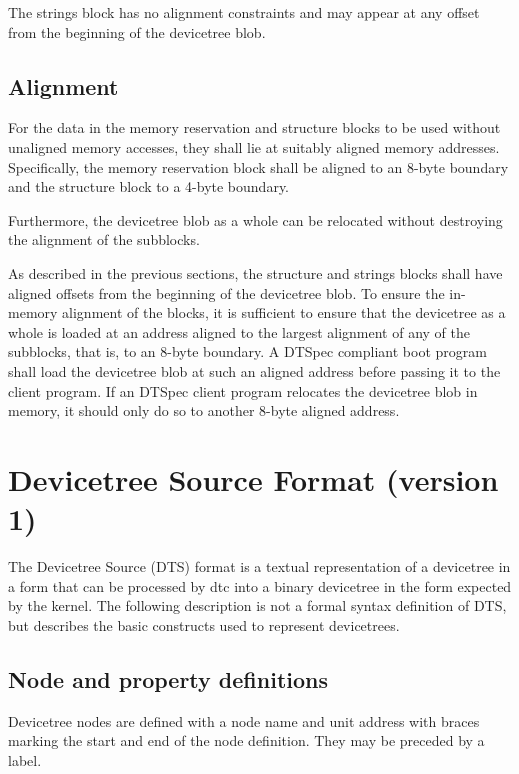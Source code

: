 \documentclass[a4paper,10pt,oneside]{sphinxmanual}
\begin{document}
The strings block has no alignment constraints and may appear at any
offset from the beginning of the devicetree blob.


\section{Alignment}
\label{flattened-format:alignment}\label{flattened-format:sect-fdt-alignment}
For the data in the memory reservation and structure blocks to be used
without unaligned memory accesses, they shall lie at suitably aligned
memory addresses. Specifically, the memory reservation block shall be
aligned to an 8-byte boundary and the structure block to a 4-byte
boundary.

Furthermore, the devicetree blob as a whole can be relocated without
destroying the alignment of the subblocks.

As described in the previous sections, the structure and strings blocks
shall have aligned offsets from the beginning of the devicetree blob.
To ensure the in-memory alignment of the blocks, it is sufficient to
ensure that the devicetree as a whole is loaded at an address aligned
to the largest alignment of any of the subblocks, that is, to an 8-byte
boundary. A DTSpec compliant boot
program shall load the devicetree blob at such an aligned address
before passing it to the client program. If an DTSpec client program
relocates the devicetree blob in memory, it should only do so to
another 8-byte aligned address.


\chapter{Devicetree Source Format (version 1)}
\label{source-language:chapter-devicetree-source-format}\label{source-language:devicetree-source-format-version-1}\label{source-language::doc}
The Devicetree Source (DTS) format is a textual representation of a
devicetree in a form that can be processed by dtc into a binary
devicetree in the form expected by the kernel. The following description is
not a formal syntax definition of DTS, but describes the basic
constructs used to represent devicetrees.


\section{Node and property definitions}
\label{source-language:node-and-property-definitions}
Devicetree nodes are defined with a node name and unit address with
braces marking the start and end of the node definition. They may be
preceded by a label.
\end{document}
